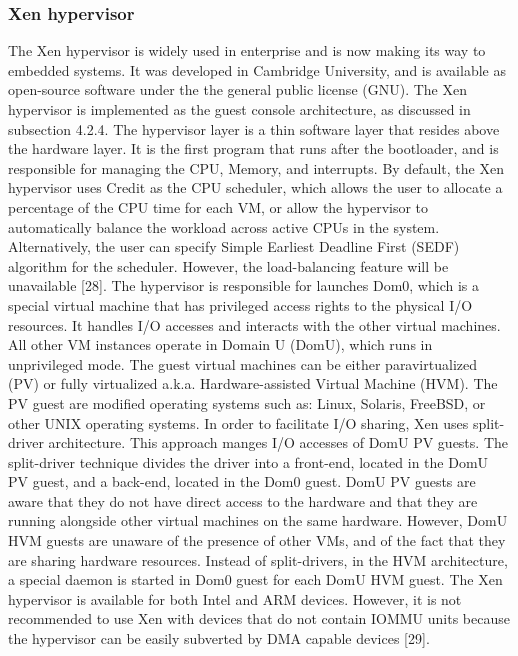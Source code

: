 \subsubsection{Xen hypervisor}
The Xen hypervisor is widely used in enterprise and is now making its way
to embedded systems. It was developed in Cambridge University, and is
available as open-source software under the the general public license (GNU).
The Xen hypervisor is implemented as the guest console architecture, as
discussed in subsection 4.2.4. The hypervisor layer is a thin software layer
that resides above the hardware layer. It is the first program that runs
after the bootloader, and is responsible for managing the CPU, Memory, and
interrupts.
By default, the Xen hypervisor uses Credit as the CPU scheduler, which
allows the user to allocate a percentage of the CPU time for each VM, or allow
the hypervisor to automatically balance the workload across active CPUs in
the system. Alternatively, the user can specify Simple Earliest Deadline First
(SEDF) algorithm for the scheduler. However, the load-balancing feature will
be unavailable [28].
The hypervisor is responsible for launches Dom0, which is a special virtual
machine that has privileged access rights to the physical I/O resources. It
handles I/O accesses and interacts with the other virtual machines. All other
VM instances operate in Domain U (DomU), which runs in unprivileged mode. The guest virtual machines can be either paravirtualized (PV) or
fully virtualized {a.k.a. Hardware-assisted Virtual Machine (HVM)}. The
PV guest are modified operating systems such as: Linux, Solaris, FreeBSD,
or other UNIX operating systems. In order to facilitate I/O sharing, Xen
uses split-driver architecture. This approach manges I/O accesses of DomU
PV guests. The split-driver technique divides the driver into a front-end,
located in the DomU PV guest, and a back-end, located in the Dom0 guest.
DomU PV guests are aware that they do not have direct access to the
hardware and that they are running alongside other virtual machines on the
same hardware. However, DomU HVM guests are unaware of the presence
of other VMs, and of the fact that they are sharing hardware resources.
Instead of split-drivers, in the HVM architecture, a special daemon is started
in Dom0 guest for each DomU HVM guest. The Xen hypervisor is available
for both Intel and ARM devices. However, it is not recommended to use Xen
with devices that do not contain IOMMU units because the hypervisor can
be easily subverted by DMA capable devices [29].

